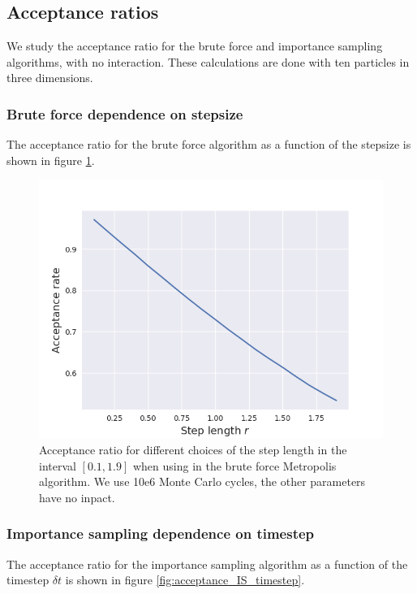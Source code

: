 \documentclass[norsk,a4paper,12pt]{article}
\begin{document}
\subsection{Acceptance ratios}
We study the acceptance ratio for the brute force and importance sampling algorithms, with no interaction. These calculations are done with ten particles in three dimensions.

\subsubsection{Brute force dependence on stepsize}
The acceptance ratio for the brute force algorithm as a function of the stepsize is shown in figure \ref{fig:acceptance_BF_stepsize}. 

\begin{figure} [H]
	\centering
	\includegraphics[scale=0.65]{images/acceptance_BF.png}
	\caption{Acceptance ratio for different choices of the step length in the interval $[0.1,1.9]$ when using in the brute force Metropolis algorithm. We use 10e6 Monte Carlo cycles, the other parameters have no inpact.}
	\label{fig:acceptance_BF_stepsize}
\end{figure} 

\subsubsection{Importance sampling dependence on timestep}
The acceptance ratio for the importance sampling algorithm as a function of the timestep $\delta t$ is shown in figure \ref{fig:acceptance_IS_timestep}. 
\end{document}
